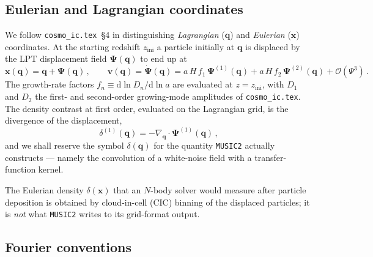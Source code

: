 \documentclass[12pt]{article}
\newcommand{\bx}{\mathbf{x}}
\newcommand{\bq}{\mathbf{q}}
\begin{document}
\subsection{Eulerian and Lagrangian coordinates}
\label{sec:notation-coords}

We follow \texttt{cosmo\_ic.tex}~\S4 in distinguishing
\emph{Lagrangian} ($\bq$) and \emph{Eulerian} ($\bx$) coordinates.
At the starting redshift $z_\mathrm{ini}$ a particle initially at
$\bq$ is displaced by the LPT displacement field $\boldsymbol\Psi(\bq)$
to end up at
\begin{equation}
  \bx(\bq) = \bq + \boldsymbol\Psi(\bq)\,,
  \qquad
  \mathbf{v}(\bq) = \dot{\boldsymbol\Psi}(\bq)
        = a\,H\,f_1\,\boldsymbol\Psi^{(1)}(\bq)
          + a\,H\,f_2\,\boldsymbol\Psi^{(2)}(\bq) + \mathcal{O}(\Psi^3)\,.
  \label{eq:lpt-defs}
\end{equation}
The growth-rate factors $f_n \equiv \mathrm{d}\ln D_n / \mathrm{d}\ln a$
are evaluated at $z = z_\mathrm{ini}$, with $D_1$ and $D_2$ the
first- and second-order growing-mode amplitudes of
\texttt{cosmo\_ic.tex}.  The density contrast at first order,
evaluated on the Lagrangian grid, is the divergence of the
displacement,
\begin{equation}
  \delta^{(1)}(\bq) = -\nabla_\bq \cdot \boldsymbol\Psi^{(1)}(\bq)\,,
  \label{eq:delta-of-q}
\end{equation}
and we shall reserve the symbol $\delta(\bq)$ for the quantity
\texttt{MUSIC2} actually constructs --- namely the convolution of a
white-noise field with a transfer-function kernel.

The Eulerian density $\delta(\bx)$ that an $N$-body solver would
measure after particle deposition is obtained by cloud-in-cell (CIC)
binning of the displaced particles; it is \emph{not} what
\texttt{MUSIC2} writes to its grid-format output.

\subsection{Fourier conventions}
\label{sec:notation-fft}
\end{document}
